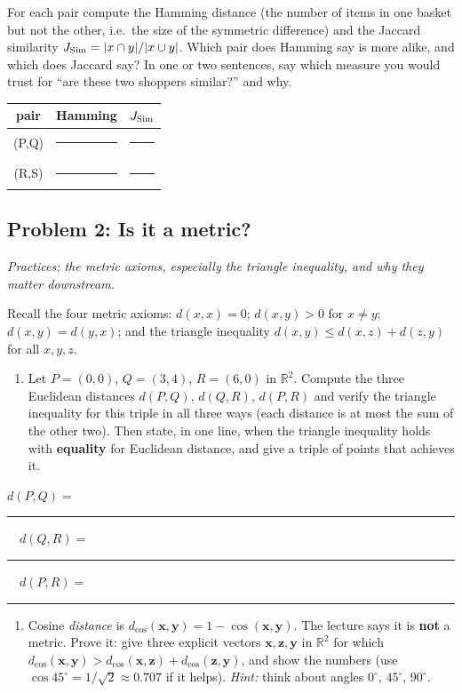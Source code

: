 \documentclass[
  11pt,
]{article}
\newcounter{none} %
\providecommand{\tightlist}{%
  \setlength{\itemsep}{0pt}\setlength{\parskip}{0pt}}
\newcommand{\answerspace}[1]{\par\vspace*{#1}}  %
\newcommand{\blank}[1][1.2in]{\rule{#1}{0.4pt}}
\newcommand{\answerpage}{\clearpage}
\begin{document}
For each pair compute the Hamming distance (the number of items in one
basket but not the other, i.e.~the size of the symmetric difference) and
the Jaccard similarity \(J_{\rm Sim} = |x\cap y|/|x\cup y|\). Which pair
does Hamming say is more alike, and which does Jaccard say? In one or
two sentences, say which measure you would trust for ``are these two
shoppers similar?'' and why.

{\def\LTcaptype{none} %
\begin{longtable}[]{@{}ccc@{}}
\toprule\noalign{}
pair & Hamming & \(J_{\rm Sim}\) \\
\midrule\noalign{}
\endhead
\bottomrule\noalign{}
\endlastfoot
(P,Q) & \blank[0.8in] & \blank[0.8in] \\
(R,S) & \blank[0.8in] & \blank[0.8in] \\
\end{longtable}
}

\answerspace{1.8in}

\answerpage

\subsection{Problem 2: Is it a metric?}\label{problem-2-is-it-a-metric}

\emph{Practices: the metric axioms, especially the triangle inequality,
and why they matter downstream.}

Recall the four metric axioms: \(d(x,x)=0\); \(d(x,y)>0\) for
\(x\ne y\); \(d(x,y)=d(y,x)\); and the triangle inequality
\(d(x,y)\le d(x,z)+d(z,y)\) for all \(x,y,z\).

\begin{enumerate}
\def\labelenumi{(\alph{enumi})}
\tightlist
\item
  Let \(P=(0,0)\), \(Q=(3,4)\), \(R=(6,0)\) in \(\mathbb{R}^2\). Compute
  the three Euclidean distances \(d(P,Q)\), \(d(Q,R)\), \(d(P,R)\) and
  verify the triangle inequality for this triple in all three ways (each
  distance is at most the sum of the other two). Then state, in one
  line, when the triangle inequality holds with \textbf{equality} for
  Euclidean distance, and give a triple of points that achieves it.
\end{enumerate}

\(d(P,Q) =\) \blank[0.7in] \(\quad d(Q,R) =\)
\blank[0.7in] \(\quad d(P,R) =\) \blank[0.7in]

\answerspace{1.9in}

\begin{enumerate}
\def\labelenumi{(\alph{enumi})}
\setcounter{enumi}{1}
\tightlist
\item
  Cosine \emph{distance} is
  \(d_{\cos}(\mathbf{x},\mathbf{y}) = 1 - \cos(\mathbf{x},\mathbf{y})\).
  The lecture says it is \textbf{not} a metric. Prove it: give three
  explicit vectors \(\mathbf{x},\mathbf{z},\mathbf{y}\) in
  \(\mathbb{R}^2\) for which
  \(d_{\cos}(\mathbf{x},\mathbf{y}) > d_{\cos}(\mathbf{x},\mathbf{z}) + d_{\cos}(\mathbf{z},\mathbf{y})\),
  and show the numbers (use \(\cos 45^\circ = 1/\sqrt2 \approx 0.707\)
  if it helps). \emph{Hint:} think about angles \(0^\circ\),
  \(45^\circ\), \(90^\circ\).
\end{enumerate}
\end{document}
